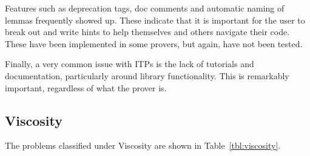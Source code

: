 \documentclass[
]{article}
\begin{document}
Features such as deprecation tags, doc comments and automatic naming of
lemmas frequently showed up. These indicate that it is important for the
user to break out and write hints to help themselves and others navigate
their code. These have been implemented in some provers, but again, have
not been tested.

Finally, a very common issue with ITPs is the lack of tutorials and
documentation, particularly around library functionality. This is
remarkably important, regardless of what the prover is.

\hypertarget{viscosity}{%
\subsection{Viscosity}\label{viscosity}}

The problems classified under Viscosity are shown in
Table~\ref{tbl:viscosity}.
\end{document}

